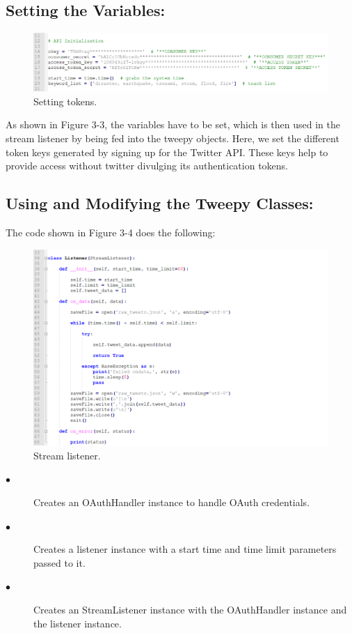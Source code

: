 \subsection{Setting the Variables:}

\begin{figure}[ht!]
	\centering
	\includegraphics[width=150mm]{code21.png}
	\caption{Setting tokens. \label{overflow}}
\end{figure}

As shown in Figure 3-3, the variables have to be set, which is then used in the stream listener by being fed into the tweepy objects. Here, we set the different token keys generated by signing up for the Twitter API. These keys help to provide access without twitter divulging its authentication tokens.

\subsection{Using and Modifying the Tweepy Classes:}

The code shown in Figure 3-4 does the following:

\begin{figure}[ht!]
	\centering
	\includegraphics[width=200mm]{code31.png}
	\caption{Stream listener. \label{overflow}}
\end{figure}

\begin{description}
	
\item[$\bullet$]Creates an OAuthHandler instance to handle OAuth credentials.

\item[$\bullet$]Creates a listener instance with a start time and time limit parameters passed to it.

\item[$\bullet$]Creates an StreamListener instance with the OAuthHandler instance and the listener instance.
\end{description}

